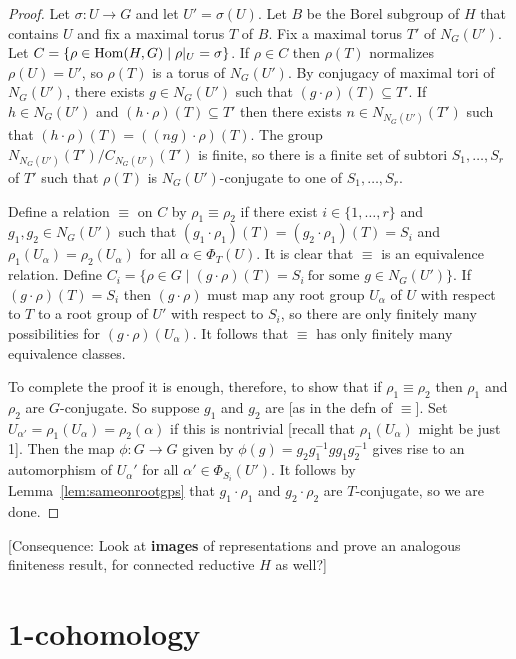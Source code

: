 \documentclass[12pt]{amsart}
\newcommand\ra{\rightarrow}
\numberwithin{equation}{section}
\theoremstyle{definition}
\theoremstyle{remark}
\theoremstyle{remark}
\begin{document}
\begin{proof}
 Let $\sigma\colon U\ra G$ and let $U'= \sigma(U)$.  Let $B$ be the Borel subgroup of $H$ that contains $U$ and fix a maximal torus $T$ of $B$.  Fix a maximal torus $T'$ of $N_G(U')$.  Let $C= \{\rho\in {\rm Hom}(H,G)\mid \rho|_U= \sigma\}$.  If $\rho\in C$ then $\rho(T)$ normalizes $\rho(U)= U'$, so $\rho(T)$ is a torus of $N_G(U')$.  By conjugacy of maximal tori of $N_G(U')$, there exists $g\in N_G(U')$ such that $(g\cdot \rho)(T)\subseteq T'$.  If $h\in N_G(U')$ and $(h\cdot \rho)(T)\subseteq T'$ then there exists $n\in N_{N_G(U')}(T')$ such that $(h\cdot \rho)(T)= ((ng)\cdot \rho)(T)$.  The group $N_{N_G(U')}(T')/C_{N_G(U')}(T')$ is finite, so there is a finite set of subtori $S_1,\ldots, S_r$ of $T'$ such that $\rho(T)$ is $N_G(U')$-conjugate to one of $S_1,\ldots, S_r$.
  
 Define a relation $\equiv$ on $C$ by $\rho_1\equiv \rho_2$ if there exist $i\in \{1,\ldots, r\}$ and $g_1,g_2\in N_G(U')$ such that $(g_1\cdot \rho_1)(T)= (g_2\cdot \rho_1)(T)= S_i$ and $\rho_1(U_\alpha)= \rho_2(U_\alpha)$ for all $\alpha\in \Phi_T(U)$.  It is clear that $\equiv$ is an equivalence relation.    Define $C_i= \{\rho\in G\mid (g\cdot \rho)(T)= S_i\ \mbox{for some $g\in N_G(U')$}\}$.  If $(g\cdot \rho)(T)= S_i$ then $(g\cdot \rho)$ must map any root group $U_\alpha$ of $U$ with respect to $T$ to a root group of $U'$ with respect to $S_i$, so there are only finitely many possibilities for $(g\cdot \rho)(U_\alpha)$.  It follows that $\equiv$ has only finitely many equivalence classes.
 
 To complete the proof it is enough, therefore, to show that if $\rho_1\equiv \rho_2$ then $\rho_1$ and $\rho_2$ are $G$-conjugate.  So suppose $g_1$ and $g_2$ are [as in the defn of $\equiv$].  Set $U_{\alpha'}= \rho_1(U_\alpha)= \rho_2(\alpha)$ if this is nontrivial [recall that $\rho_1(U_\alpha)$ might be just 1].  Then the map $\phi\colon G\ra G$ given by $\phi(g)= g_2g_1^{-1}gg_1g_2^{-1}$ gives rise to an automorphism of $U_\alpha'$ for all $\alpha'\in \Phi_{S_i}(U')$.  It follows by Lemma~\ref{lem:sameonrootgps} that $g_1\cdot \rho_1$ and $g_2\cdot \rho_2$ are $T$-conjugate, so we are done.
\end{proof}

[Consequence: Look at {\bf images} of representations and prove an analogous finiteness result, for connected reductive $H$ as well?]


\section{1-cohomology}
\end{document}
